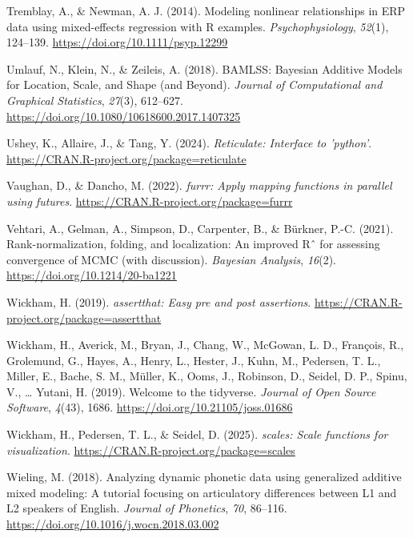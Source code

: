 \documentclass[
  doc,
  floatsintext,
  longtable,
  a4paper,
  nolmodern,
  notxfonts,
  notimes,
  colorlinks=true,linkcolor=blue,citecolor=blue,urlcolor=blue]{apa7}
\newlength{\cslhangindent}
\newenvironment{CSLReferences}[2] %
 {\begin{list}{}{%
  \setlength{\itemindent}{0pt}
  \setlength{\leftmargin}{0pt}
  \setlength{\parsep}{0pt}
  \ifodd #1
   \setlength{\leftmargin}{\cslhangindent}
   \setlength{\itemindent}{-1\cslhangindent}
  \fi
  \setlength{\itemsep}{#2\baselineskip}}}
 {\end{list}}
\begin{document}
\begin{CSLReferences}{1}{0}
Tremblay, A., \& Newman, A. J. (2014). Modeling nonlinear relationships
in ERP data using mixed{-}effects regression with R examples.
\emph{Psychophysiology}, \emph{52}(1), 124--139.
\url{https://doi.org/10.1111/psyp.12299}

Umlauf, N., Klein, N., \& Zeileis, A. (2018). BAMLSS: Bayesian Additive
Models for Location, Scale, and Shape (and Beyond). \emph{Journal of
Computational and Graphical Statistics}, \emph{27}(3), 612--627.
\url{https://doi.org/10.1080/10618600.2017.1407325}

Ushey, K., Allaire, J., \& Tang, Y. (2024). \emph{Reticulate: Interface
to 'python'}. \url{https://CRAN.R-project.org/package=reticulate}

Vaughan, D., \& Dancho, M. (2022). \emph{{furrr}: Apply mapping
functions in parallel using futures}.
\url{https://CRAN.R-project.org/package=furrr}

Vehtari, A., Gelman, A., Simpson, D., Carpenter, B., \& Bürkner, P.-C.
(2021). Rank-normalization, folding, and localization: An improved Rˆ
for assessing convergence of MCMC (with discussion). \emph{Bayesian
Analysis}, \emph{16}(2). \url{https://doi.org/10.1214/20-ba1221}

Wickham, H. (2019). \emph{{assertthat}: Easy pre and post assertions}.
\url{https://CRAN.R-project.org/package=assertthat}

Wickham, H., Averick, M., Bryan, J., Chang, W., McGowan, L. D.,
François, R., Grolemund, G., Hayes, A., Henry, L., Hester, J., Kuhn, M.,
Pedersen, T. L., Miller, E., Bache, S. M., Müller, K., Ooms, J.,
Robinson, D., Seidel, D. P., Spinu, V., \ldots{} Yutani, H. (2019).
Welcome to the {tidyverse}. \emph{Journal of Open Source Software},
\emph{4}(43), 1686. \url{https://doi.org/10.21105/joss.01686}

Wickham, H., Pedersen, T. L., \& Seidel, D. (2025). \emph{{scales}:
Scale functions for visualization}.
\url{https://CRAN.R-project.org/package=scales}

Wieling, M. (2018). Analyzing dynamic phonetic data using generalized
additive mixed modeling: A tutorial focusing on articulatory differences
between L1 and L2 speakers of English. \emph{Journal of Phonetics},
\emph{70}, 86--116. \url{https://doi.org/10.1016/j.wocn.2018.03.002}


\end{CSLReferences}
\end{document}
